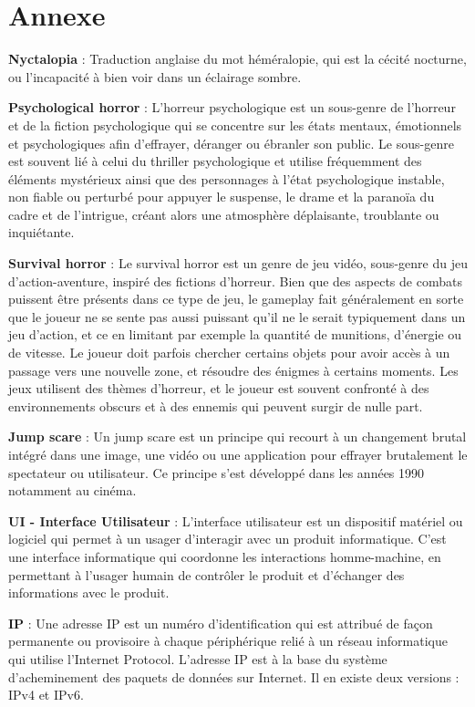 \section{Annexe}

\noindent \textbf{Nyctalopia} : Traduction anglaise du mot héméralopie, qui est la cécité nocturne, ou l'incapacité à bien voir dans un éclairage sombre.

\noindent \textbf{Psychological horror} : L'horreur psychologique est un sous-genre de l'horreur et de la fiction psychologique qui se concentre sur les états mentaux, émotionnels et psychologiques afin d'effrayer, déranger ou ébranler son public. Le sous-genre est souvent lié à celui du thriller psychologique et utilise fréquemment des éléments mystérieux ainsi que des personnages à l'état psychologique instable, non fiable ou perturbé pour appuyer le suspense, le drame et la paranoïa du cadre et de l'intrigue, créant alors une atmosphère déplaisante, troublante ou inquiétante.

\noindent \textbf{Survival horror} : Le survival horror est un genre de jeu vidéo, sous-genre du jeu d'action-aventure, inspiré des fictions d'horreur. Bien que des aspects de combats puissent être présents dans ce type de jeu, le gameplay fait généralement en sorte que le joueur ne se sente pas aussi puissant qu'il ne le serait typiquement dans un jeu d'action, et ce en limitant par exemple la quantité de munitions, d'énergie ou de vitesse. Le joueur doit parfois chercher certains objets pour avoir accès à un passage vers une nouvelle zone, et résoudre des énigmes à certains moments. Les jeux utilisent des thèmes d'horreur, et le joueur est souvent confronté à des environnements obscurs et à des ennemis qui peuvent surgir de nulle part.

\noindent \textbf{Jump scare} : Un jump scare est un principe qui recourt à un changement brutal intégré dans une image, une vidéo ou une application pour effrayer brutalement le spectateur ou utilisateur. Ce principe s'est développé dans les années 1990 notamment au cinéma.

\noindent \textbf{UI - Interface Utilisateur} : L’interface utilisateur est un dispositif matériel ou logiciel qui permet à un usager d'interagir avec un produit informatique. C'est une interface informatique qui coordonne les interactions homme-machine, en permettant à l'usager humain de contrôler le produit et d'échanger des informations avec le produit.

\noindent \textbf{IP} : Une adresse IP est un numéro d'identification qui est attribué de façon permanente ou provisoire à chaque périphérique relié à un réseau informatique qui utilise l'Internet Protocol. L'adresse IP est à la base du système d'acheminement des paquets de données sur Internet. Il en existe deux versions : IPv4 et IPv6.

